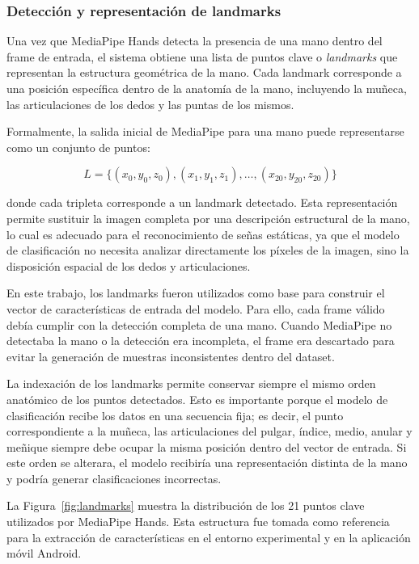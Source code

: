 	\subsubsection{Detección y representación de landmarks}
	
	Una vez que MediaPipe Hands detecta la presencia de una mano dentro del frame de
	entrada, el sistema obtiene una lista de puntos clave o \textit{landmarks} que
	representan la estructura geométrica de la mano. Cada landmark corresponde a una
	posición específica dentro de la anatomía de la mano, incluyendo la muñeca, las
	articulaciones de los dedos y las puntas de los mismos.
	
	Formalmente, la salida inicial de MediaPipe para una mano puede representarse como
	un conjunto de puntos:
	
	\[
	L = \{(x_0,y_0,z_0), (x_1,y_1,z_1), \ldots, (x_{20},y_{20},z_{20})\}
	\]
	
	donde cada tripleta corresponde a un landmark detectado. Esta representación
	permite sustituir la imagen completa por una descripción estructural de la mano,
	lo cual es adecuado para el reconocimiento de señas estáticas, ya que el
	modelo de clasificación no necesita analizar directamente los píxeles de la
	imagen, sino la disposición espacial de los dedos y articulaciones.
	
	En este trabajo, los landmarks fueron utilizados como base para construir el
	vector de características de entrada del modelo. Para ello, cada frame válido
	debía cumplir con la detección completa de una mano. Cuando MediaPipe no detectaba
	la mano o la detección era incompleta, el frame era descartado para evitar la
	generación de muestras inconsistentes dentro del dataset.
	
	La indexación de los landmarks permite conservar siempre el mismo orden anatómico
	de los puntos detectados. Esto es importante porque el modelo de clasificación
	recibe los datos en una secuencia fija; es decir, el punto correspondiente a la
	muñeca, las articulaciones del pulgar, índice, medio, anular y meñique siempre
	debe ocupar la misma posición dentro del vector de entrada. Si este orden se
	alterara, el modelo recibiría una representación distinta de la mano y podría
	generar clasificaciones incorrectas.
	
	La Figura~\ref{fig:landmarks} muestra la distribución de los 21 puntos
	clave utilizados por MediaPipe Hands. Esta estructura fue tomada como referencia
	para la extracción de características en el entorno experimental y en la aplicación
	móvil Android.
	
